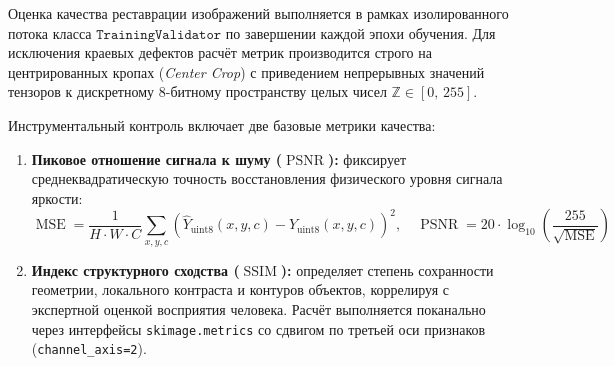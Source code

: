 \documentclass[12pt,a4paper]{article}
\begin{document}
Оценка качества реставрации изображений выполняется в рамках изолированного потока класса $\texttt{TrainingValidator}$ по завершении каждой эпохи обучения. Для исключения краевых дефектов расчёт метрик производится строго на центрированных кропах (\textit{Center Crop}) с приведением непрерывных значений тензоров к дискретному 8-битному пространству целых чисел $\mathbb{Z} \in [0,\, 255]$.

Инструментальный контроль включает две базовые метрики качества:
\begin{enumerate}
    \item \textbf{Пиковое отношение сигнала к шуму ($\operatorname{PSNR}$):} фиксирует среднеквадратическую точность восстановления физического уровня сигнала яркости:
    \begin{equation}
    \operatorname{MSE} = \frac{1}{H \cdot W \cdot C}\sum_{x,y,c} \left( \hat{Y}_{\text{uint8}}(x,y,c) - Y_{\text{uint8}}(x,y,c) \right)^2, \quad \operatorname{PSNR} = 20 \cdot \log_{10} \left( \frac{255}{\sqrt{\operatorname{MSE}}} \right)
    \end{equation}
    \item \textbf{Индекс структурного сходства ($\operatorname{SSIM}$):} определяет степень сохранности геометрии, локального контраста и контуров объектов, коррелируя с экспертной оценкой восприятия человека. Расчёт выполняется поканально через интерфейсы \texttt{skimage.metrics} со сдвигом по третьей оси признаков (\texttt{channel\_axis=2}).
\end{enumerate}
\end{document}

